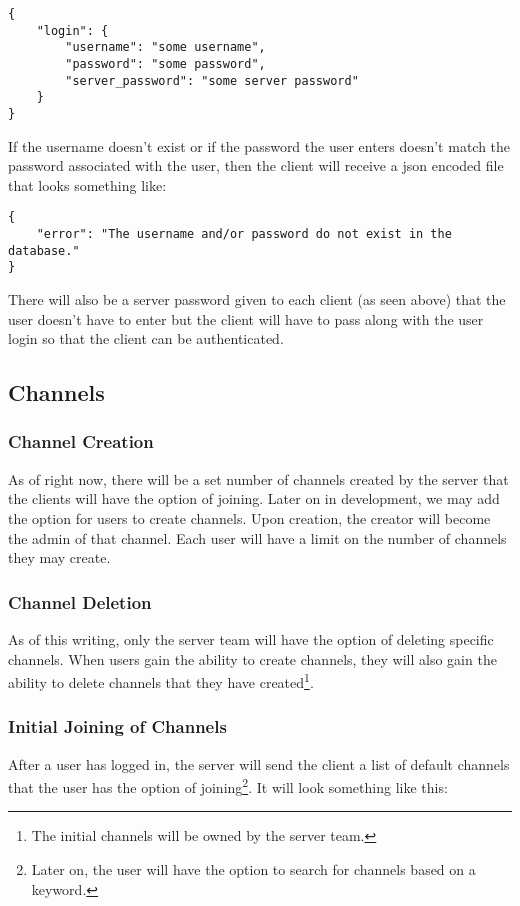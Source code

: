 \begin{lstlisting}[style=json]
{
    "login": {
        "username": "some username",
        "password": "some password",
        "server_password": "some server password"
    }
}
\end{lstlisting}

If the username doesn't exist or if the password the user enters doesn't match the password associated with the user, then the client will receive a \gls{json} encoded file that looks something like:

\begin{lstlisting}[style=json]
{
    "error": "The username and/or password do not exist in the database."
}
\end{lstlisting}

There will also be a server password given to each client (as seen above) that the user doesn't have to enter but the client will have to pass along with the user login so that the client can be authenticated.

\subsection{Channels}
\subsubsection{Channel Creation}
As of right now, there will be a set number of channels created by the server that the clients will have the option of joining. Later on in development, we may add the option for users to create channels. Upon creation, the creator will become the admin of that channel. Each user will have a limit on the number of channels they may create.

\subsubsection{Channel Deletion}
As of this writing, only the server team will have the option of deleting specific channels. When users gain the ability to create channels, they will also gain the ability to delete channels that they have created\footnote{The initial channels will be owned by the server team.}.

\subsubsection{Initial Joining of Channels}
After a user has logged in, the server will send the client a list of default channels that the user has the option of joining\footnote{Later on, the user will have the option to search for channels based on a keyword.}. It will look something like this:


